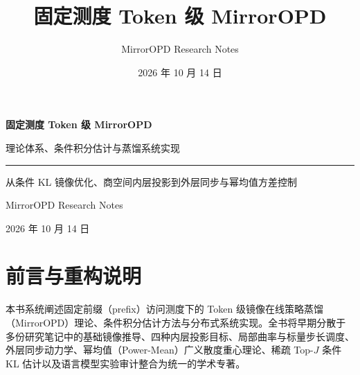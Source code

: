\documentclass[lang=cn,scheme=chinese,openany]{elegantbook}
\title{固定测度 Token 级 MirrorOPD}
\author{MirrorOPD Research Notes}
\date{2026 年 10 月 14 日}
\begin{document}
\hypersetup{pageanchor=false}
\begin{titlepage}
\centering
\vspace*{35mm}
{\Huge\bfseries 固定测度 Token 级 MirrorOPD\par}
\vspace{12mm}
{\Large 理论体系、条件积分估计与蒸馏系统实现\par}
\vspace{16mm}
{\color{structurecolor}\rule{0.8\textwidth}{1pt}\par}
\vspace{12mm}
{\large 从条件 KL 镜像优化、商空间内层投影到外层同步与幂均值方差控制\par}
\vfill
{\large MirrorOPD Research Notes\par}
\vspace{5mm}
{\large 2026 年 10 月 14 日\par}
\vspace{20mm}
\end{titlepage}
\frontmatter
\hypersetup{pageanchor=true}

\chapter*{前言与重构说明}
本书系统阐述固定前缀（prefix）访问测度下的 Token 级镜像在线策略蒸馏（MirrorOPD）理论、条件积分估计方法与分布式系统实现。全书将早期分散于多份研究笔记中的基础镜像推导、四种内层投影目标、局部曲率与标量步长调度、外层同步动力学、幂均值（Power-Mean）广义散度重心理论、稀疏 Top-$J$ 条件 KL 估计以及语言模型实验审计整合为统一的学术专著。
\end{document}
